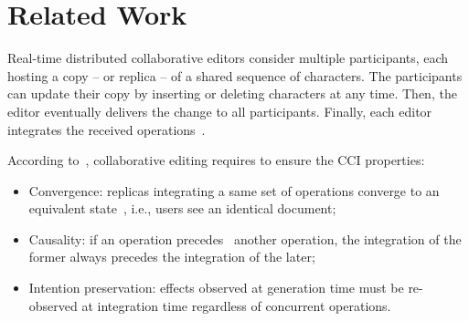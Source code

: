 \section{Related Work}
\label{sec:relatedwork}

Real-time distributed collaborative editors consider multiple participants, each
hosting a copy -- or replica -- of a shared sequence of characters. The
participants can update their copy by inserting or deleting characters at any
time. Then, the editor eventually delivers the change to all
participants. Finally, each editor integrates the received
operations~\cite{saito2005optimistic}.

\noindent According to~\cite{sun1998achieving}, collaborative editing requires
to ensure the CCI properties:
\begin{itemize}
\item Convergence: replicas integrating a same set of operations converge to an
  equivalent state~\cite{bailis2013eventual, shapiro2011conflict}, i.e., users
  see an identical document;
\item Causality: if an operation precedes~\cite{lamport1978time} another
  operation, the integration of the former always precedes the integration of
  the later;
\item Intention preservation: effects observed at generation time must be
  re-observed at integration time regardless of concurrent operations. 
\end{itemize}





